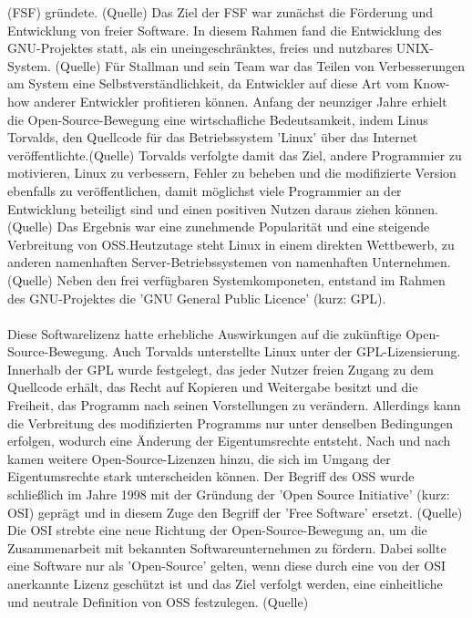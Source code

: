 (FSF) gründete. (Quelle) Das Ziel der FSF war zunächst die Förderung und Entwicklung von freier Software. In diesem Rahmen fand die Entwicklung des GNU-Projektes statt, als ein uneingeschränktes, freies und nutzbares UNIX-System. (Quelle) Für Stallman und sein Team war das Teilen von Verbesserungen am System eine Selbstverständlichkeit, da Entwickler auf diese Art vom Know-how anderer Entwickler profitieren können. Anfang der neunziger Jahre erhielt die Open-Source-Bewegung eine wirtschafliche Bedeutsamkeit, indem Linus Torvalds, den Quellcode für das Betriebssystem 'Linux' über das Internet veröffentlichte.(Quelle) Torvalds verfolgte damit das Ziel, andere Programmier zu motivieren, Linux zu verbessern, Fehler zu beheben und die modifizierte Version ebenfalls zu veröffentlichen, damit möglichst viele Programmier an der Entwicklung beteiligt sind und einen positiven Nutzen daraus ziehen können.(Quelle) Das Ergebnis war eine zunehmende Popularität und eine steigende Verbreitung von OSS.Heutzutage steht Linux in einem direkten Wettbewerb, zu anderen namenhaften Server-Betriebssystemen von namenhaften Unternehmen. (Quelle) Neben den frei verfügbaren Systemkomponeten, entstand im Rahmen des GNU-Projektes die 'GNU General Public Licence' (kurz: GPL).\\\\ Diese Softwarelizenz hatte erhebliche Auswirkungen auf die zukünftige Open-Source-Bewegung. Auch Torvalds unterstellte Linux unter der GPL-Lizensierung. Innerhalb der GPL wurde festgelegt, das jeder Nutzer freien Zugang zu dem Quellcode erhält, das Recht auf Kopieren und Weitergabe besitzt und die Freiheit, das Programm nach seinen Vorstellungen zu verändern. Allerdings kann die Verbreitung des modifizierten Programms nur unter denselben Bedingungen erfolgen, wodurch eine Änderung der Eigentumsrechte entsteht. Nach und nach kamen weitere Open-Source-Lizenzen hinzu, die sich im Umgang der Eigentumsrechte stark unterscheiden können. Der Begriff des OSS wurde schließlich im Jahre 1998 mit der Gründung der 'Open Source Initiative' (kurz: OSI) geprägt und in diesem Zuge den Begriff der 'Free Software' ersetzt. (Quelle) Die OSI strebte eine neue Richtung der Open-Source-Bewegung an, um die Zusammenarbeit mit bekannten Softwareunternehmen zu fördern. Dabei sollte eine Software nur als 'Open-Source' gelten, wenn diese durch eine von der OSI anerkannte Lizenz geschützt ist und das Ziel verfolgt werden, eine einheitliche und neutrale Definition von OSS festzulegen. (Quelle)






